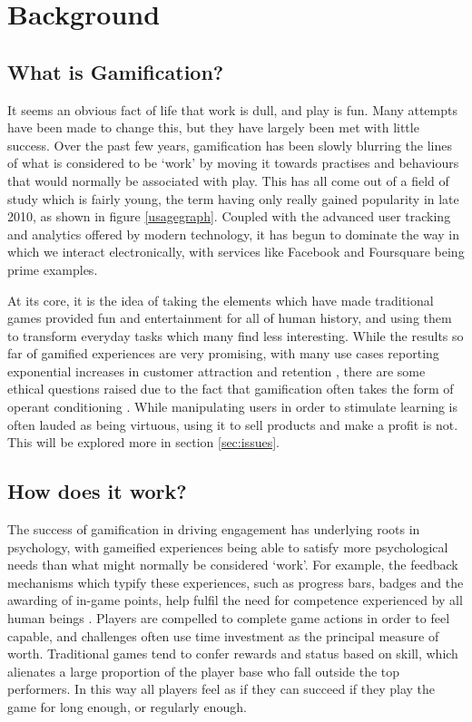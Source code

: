 \documentclass{article}
\begin{document}
\section{Background}
\subsection{What is Gamification?}
It seems an obvious fact of life that work is dull, and play is fun. Many attempts have been made to change this, but they have largely been met with little success. Over the past few years, gamification has been slowly blurring the lines of what is considered to be `work' by moving it towards practises and behaviours that would normally be associated with play. This has all come out of a field of study which is fairly young, the term having only really gained popularity in late 2010, as shown in figure \ref{usagegraph}. Coupled with the advanced user tracking and analytics offered by modern technology, it has begun to dominate the way in which we interact electronically, with services like Facebook and Foursquare being prime examples.

At its core, it is the idea of taking the elements which have made traditional games provided fun and entertainment for all of human history, and using them to transform everyday tasks which many find less interesting. While the results so far of gamified experiences are very promising, with many use cases reporting exponential increases in customer attraction and retention \cite{zichermann2010game}, there are some ethical questions raised due to the fact that gamification often takes the form of operant conditioning \cite{kapp2012gamification}. While manipulating users in order to stimulate learning is often lauded as being virtuous, using it to sell products and make a profit is not. This will be explored more in section \ref{sec:issues}.

\subsection{How does it work?}
The success of gamification in driving engagement has underlying roots in psychology, with gameified experiences being able to satisfy more psychological needs than what might normally be considered `work'. For example, the feedback mechanisms which typify these experiences, such as progress bars, badges and the awarding of in-game points, help fulfil the need for competence experienced by all human beings \cite{przybylski2010motivational}. Players are compelled to complete game actions in order to feel capable, and challenges often use time investment as the principal measure of worth. Traditional games tend to confer rewards and status based on skill, which alienates a large proportion of the player base who fall outside the top performers. In this way all players feel as if they can succeed if they play the game for long enough, or regularly enough.
\end{document}
